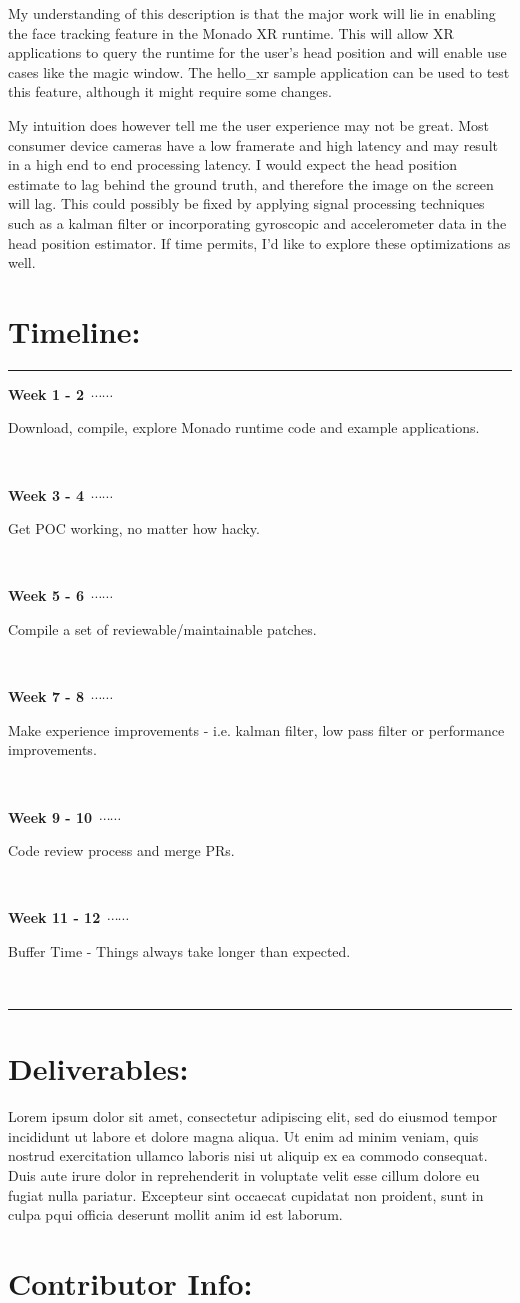 \documentclass{article}
\newcommand\ytl[2]{
\parbox[b]{10em}{\hfill{\bfseries\sffamily
#1}~$\cdots\cdots$~}\makebox[0pt][c]{$\bullet$}\vrule\quad \parbox[c]{8cm}{\vspace{3pt}\raggedright\sffamily #2.\\[3pt]}\\[-3pt]}
\begin{document}
\begin{normalsize}
\begin{quote}
\end{quote}

My understanding of this description is that the major work will lie in enabling
the face tracking feature in the Monado XR runtime. This will allow XR
applications to query the runtime for the user's head position and will enable use
cases like the magic window. The hello\_xr sample application can be used to test
this feature, although it might require some changes.

My intuition does however tell me the user experience may not be great. Most
consumer device cameras have a low framerate and high latency and may result in a
high end to end processing latency. I would expect the head position estimate to
lag behind the ground truth, and therefore the image on the screen will lag. This
could possibly be fixed by applying signal processing techniques such as a kalman
filter or incorporating gyroscopic and accelerometer data in the head position
estimator. If time permits, I'd like to explore these optimizations as well.

\section{Timeline:}

\begin{table}[H]
\centering
\begin{minipage}[t]{.7\linewidth}
\rule{\linewidth}{1pt}
\ytl{Week 1 - 2}{Download, compile, explore Monado runtime code and example applications}
\ytl{Week 3 - 4}{Get POC working, no matter how hacky}
\ytl{Week 5 - 6}{Compile a set of reviewable/maintainable patches}
\ytl{Week 7 - 8}{Make experience improvements - i.e. kalman filter, low pass filter or performance improvements}
\ytl{Week 9 - 10}{Code review process and merge PRs}
\ytl{Week 11 - 12}{Buffer Time - Things always take longer than expected}
\bigskip
\rule{\linewidth}{1pt}%
\end{minipage}%
\end{table}

\section{Deliverables:}

Lorem ipsum dolor sit amet, consectetur adipiscing elit, sed do eiusmod tempor
incididunt ut labore et dolore magna aliqua. Ut enim ad minim veniam, quis nostrud
exercitation ullamco laboris nisi ut aliquip ex ea commodo consequat. Duis aute
irure dolor in reprehenderit in voluptate velit esse cillum dolore eu fugiat nulla
pariatur. Excepteur sint occaecat cupidatat non proident, sunt in culpa pqui
officia deserunt mollit anim id est laborum.

\section{Contributor Info:}



\end{normalsize}
\end{document}

